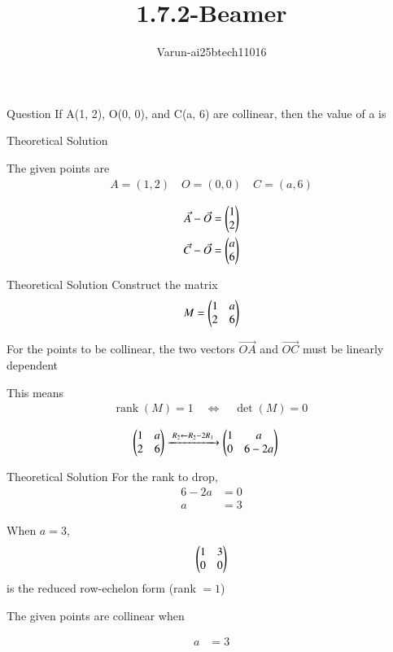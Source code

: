 \documentclass{beamer}
\title %
{1.7.2-Beamer}
\author %
{Varun-ai25btech11016}
\begin{document}
\frame{\titlepage}
\begin{frame}{Question}
If A(1, 2), O(0, 0), and C(a, 6) are collinear, then the value of a is

\end{frame}



\begin{frame}{Theoretical Solution }

 The given points are
\begin{align}
A = (1,2) \quad O = (0,0) \quad C = (a,6)
\end{align}

\begin{align}    
\Vec{A}-\Vec{O}& = \begin{pmatrix}1 \\ 2\end{pmatrix}\\ 
 \Vec{C}-\Vec{O}& = \begin{pmatrix}a \\ 6\end{pmatrix}
\end{align}
\end{frame}
\begin{frame}{Theoretical Solution }
Construct the matrix
\begin{align} 
M = \begin{pmatrix}1 & a \\ 2 & 6\end{pmatrix}
\end{align}

For the points to be collinear, the two vectors $\Vec{OA}$ and $\vec{OC}$ must be linearly dependent



This means
\begin{align}
\operatorname{rank}(M) = 1 \quad \Leftrightarrow \quad \det(M) = 0 \
\end{align}



\begin{align}
\begin{pmatrix}1 & a \\ 2 & 6\end{pmatrix}
&\xrightarrow{\;R_2 \gets R_2 - 2R_1\;}
\begin{pmatrix}1 & a \\ 0 & 6 - 2a\end{pmatrix}
\end{align}
\end{frame}
\begin{frame}{Theoretical Solution }
For the rank to drop,
\begin{align}
6 - 2a &= 0 \\
a &= 3
\end{align}

When $a=3$,
\[
\begin{pmatrix}1 & 3 \\ 0 & 0\end{pmatrix}
\]
is the reduced row-echelon form (rank $=1$)




The given points are collinear when

\begin{align}
a &= 3
\end{align}

\end{frame}
\end{document}
